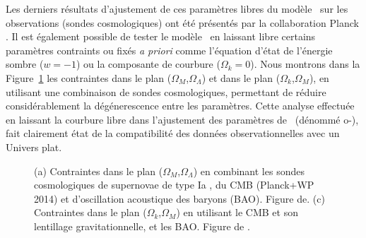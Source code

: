 \documentclass[../main/main.tex]{subfiles}
\begin{document}
Les derniers résultats d'ajustement de ces paramètres libres du modèle \lcdm\ sur les
observations (sondes cosmologiques) ont été présentés
par la collaboration Planck \citep{Planckparams2018}. Il est également
possible de tester le modèle \lcdm\ en laissant libre certains
paramètres contraints ou fixés \textit{a priori} comme l'équation d'état
de l'énergie sombre ($w=-1$) ou la composante de courbure
($\Omega_{k}=0$).
Nous montrons dans la Figure~\ref{fig:flatcontrainte} les contraintes dans le plan
($\Omega_{M}$,$\Omega_{\Lambda}$) et dans le plan ($\Omega_{k}$,$\Omega_{M}$), en utilisant une combinaison de
sondes cosmologiques, permettant de réduire considérablement la
dégénerescence entre les paramètres. Cette analyse effectuée en laissant
la courbure libre dans l'ajustement des paramètres de \lcdm\ (dénommé o-\lcdm), fait clairement état
de la compatibilité des données observationnelles avec un Univers plat.

\begin{figure}[ht]
\centering
{}\hfill
{}
\caption[]{(a) Contraintes dans le plan
  ($\Omega_{M}$,$\Omega_{\Lambda}$) en combinant les sondes
  cosmologiques de supernovae de type Ia \citep[JLA,][]{Betoule2014}, du
  CMB (Planck+WP 2014) et d'oscillation
  acoustique des baryons (BAO). Figure de\citet{Betoule2014}. (c)
  Contraintes dans le plan ($\Omega_{k}$,$\Omega_{M}$) en utilisant le
  CMB et son lentillage gravitationnelle, et les BAO. Figure de \citet{Planckparams2018}.}
\label{fig:flatcontrainte}
\end{figure}
\end{document}
